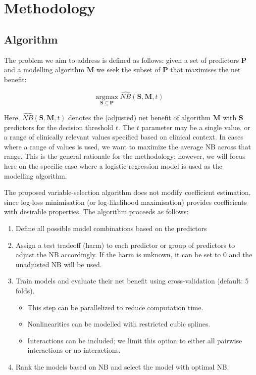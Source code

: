 \section{Methodology}

\subsection{Algorithm}
\label{sec:algorithm}
The problem we aim to address is defined as follows: given a set of predictors $\mathbf{P}$ and a modelling algorithm $\mathbf{M}$ we seek the subset of $\mathbf{P}$ that maximises the net benefit:

\begin{equation}
\underset{\mathbf{S} \subseteq \mathbf{P}}{\operatorname{argmax}} \widehat{NB}(\mathbf{S}, \mathbf{M}, t)
\end{equation}

Here, $\widehat{NB}(\mathbf{S}, \mathbf{M}, t)$ denotes the (adjusted) net benefit of algorithm $\mathbf{M}$ with $\mathbf{S}$ predictors for the decision threshold $t$. The $t$ parameter may be a single value, or a range of clinically relevant values specified based on clinical context. In cases where a range of values is used, we want to maximize the average \gls{NB} across that range. This is the general rationale for the methodology; however, we will focus here on the specific case where a logistic regression model is used as the modelling algorithm.

The proposed variable-selection algorithm does not modify coefficient estimation, since log-loss minimisation (or log-likelihood maximisation) provides coefficients with desirable properties. The algorithm proceeds as follows:

\begin{enumerate}
\item Define all possible model combinations based on the predictors
\item Assign a test tradeoff (harm) to each predictor or group of predictors to adjust the \gls{NB} accordingly. If the harm is unknown, it can be set to 0 and the unadjusted \gls{NB} will be used.
\item Train models and evaluate their net benefit using cross-validation (default: 5 folds).
\begin{itemize}
\item This step can be parallelized to reduce computation time.
\item Nonlinearities can be modelled with restricted cubic splines.
\item Interactions can be included; we limit this option to either all pairwise interactions or no interactions.
\end{itemize}
\item Rank the models based on \gls{NB} and select the model with optimal \gls{NB}.
\end{enumerate}


